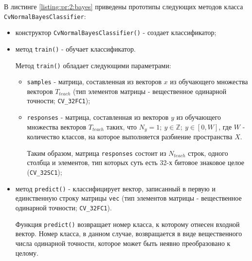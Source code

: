В листинге \ref{listing:pr:2:bayes} приведены прототипы следующих методов класса \verb|CvNormalBayesClassifier|:

\begin{itemize}

	\item конструктор \verb|CvNormalBayesClassifier()| - создает классификатор;
	\item метод \verb|train()| - обучает классификатор.

	Метод \verb|train()| обладает следующими параметрами:

	\begin{itemize}

		\item \verb|samples| - матрица, составленная из векторов $x$ из обучающего множества векторов $T_{teach}$ (тип элементов матрицы - вещественное одинарной точности; \verb|CV_32FC1|);
		\item \verb|responses| - матрица, составленная из векторов $y$ из обучающего множества векторов $T_{teach}$ таких, что $N_y = 1 ;~ y \in \mathbb{Z} ;~ y \in [0, W]$, где $W$ - количество классов, на которое выполняется разбиение пространства $X$.

		Таким образом, матрица \verb|responses| состоит из $N_{teach}$ строк, одного столбца и элементов, тип которых суть есть 32-х битовое знаковое целое (\verb|CV_32SC1|);

	\end{itemize}

	\item метод \verb|predict()| - классифицирует вектор, записанный в первую и единственную строку матрицы \verb|vec| (тип элементов матрицы - вещественное одинарной точности; \verb|CV_32FC1|).

	Функция \verb|predict()| возвращает номер класса, к которому отнесен входной вектор. Номер класса, в данном случае, возвращается в виде вещественного числа одинарной точности, которое может быть неявно преобразовано к целому.

\end{itemize}

